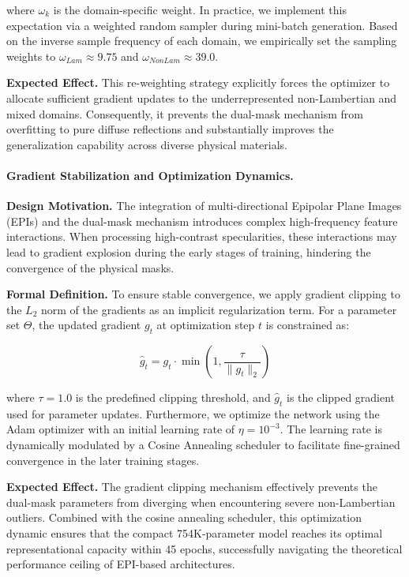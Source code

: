 \documentclass[lettersize,journal]{IEEEtran}
\begin{document}
where $\omega_k$ is the domain-specific weight. In practice, we implement this expectation via a weighted random sampler during mini-batch generation. Based on the inverse sample frequency of each domain, we empirically set the sampling weights to $\omega_{Lam} \approx 9.75$ and $\omega_{NonLam} \approx 39.0$. 

\textbf{Expected Effect.} This re-weighting strategy explicitly forces the optimizer to allocate sufficient gradient updates to the underrepresented non-Lambertian and mixed domains. Consequently, it prevents the dual-mask mechanism from overfitting to pure diffuse reflections and substantially improves the generalization capability across diverse physical materials.

\paragraph{Gradient Stabilization and Optimization Dynamics.}

\textbf{Design Motivation.} The integration of multi-directional Epipolar Plane Images (EPIs) and the dual-mask mechanism introduces complex high-frequency feature interactions. When processing high-contrast specularities, these interactions may lead to gradient explosion during the early stages of training, hindering the convergence of the physical masks.

\textbf{Formal Definition.} To ensure stable convergence, we apply gradient clipping to the $L_2$ norm of the gradients as an implicit regularization term. For a parameter set $\Theta$, the updated gradient $g_t$ at optimization step $t$ is constrained as:

\begin{equation}
\label{eq:eq14}
\hat{g}_t = g_t \cdot \min\left(1, \frac{\tau}{\|g_t\|_2}\right)
\end{equation}

where $\tau = 1.0$ is the predefined clipping threshold, and $\hat{g}_t$ is the clipped gradient used for parameter updates. Furthermore, we optimize the network using the Adam optimizer with an initial learning rate of $\eta = 10^{-3}$. The learning rate is dynamically modulated by a Cosine Annealing scheduler to facilitate fine-grained convergence in the later training stages.

\textbf{Expected Effect.} The gradient clipping mechanism effectively prevents the dual-mask parameters from diverging when encountering severe non-Lambertian outliers. Combined with the cosine annealing scheduler, this optimization dynamic ensures that the compact 754K-parameter model reaches its optimal representational capacity within 45 epochs, successfully navigating the theoretical performance ceiling of EPI-based architectures.
\end{document}
